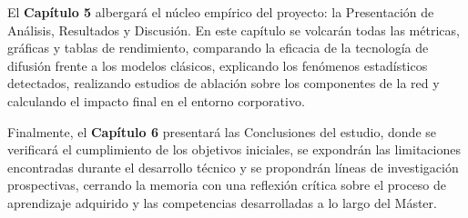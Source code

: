 El \textbf{Capítulo 5} albergará el núcleo empírico del proyecto: la Presentación de Análisis, Resultados y Discusión. En este capítulo se volcarán todas las métricas, gráficas y tablas de rendimiento, comparando la eficacia de la tecnología de difusión frente a los modelos clásicos, explicando los fenómenos estadísticos detectados, realizando estudios de ablación sobre los componentes de la red y calculando el impacto final en el entorno corporativo.

Finalmente, el \textbf{Capítulo 6} presentará las Conclusiones del estudio, donde se verificará el cumplimiento de los objetivos iniciales, se expondrán las limitaciones encontradas durante el desarrollo técnico y se propondrán líneas de investigación prospectivas, cerrando la memoria con una reflexión crítica sobre el proceso de aprendizaje adquirido y las competencias desarrolladas a lo largo del Máster.
